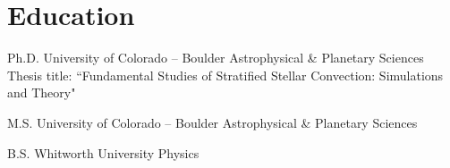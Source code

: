 \section{Education}

        {Ph.D.}
        {University of Colorado -- Boulder}
        {Astrophysical \& Planetary Sciences}{}
		{Thesis title: ``Fundamental Studies of Stratified Stellar Convection: Simulations and Theory"}

        {M.S.}
        {University of Colorado -- Boulder}
        {Astrophysical \& Planetary Sciences}{}{}

        {B.S.}
        {Whitworth University}
        {Physics}{}{}
